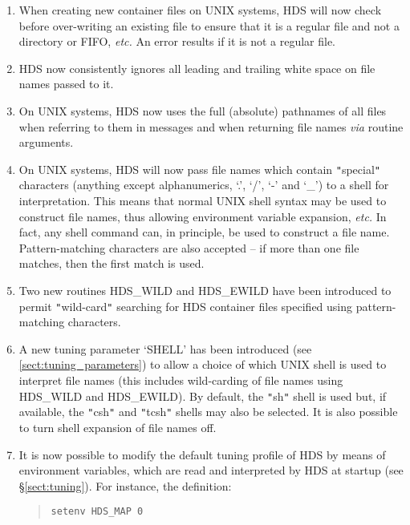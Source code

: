 \documentclass[11pt]{article}
\newcommand{\htmlref}[2]{#1}
\newcommand{\qt}[1]{``#1''}
\newcommand{\st}[1]{{\em{#1}}}
\renewcommand{\qt}[1]{{\tt{"}}#1{\tt{"}}}
\begin{document}
\begin{enumerate}
\item
When creating new container files on UNIX systems, HDS will now check
before over-writing an existing file to ensure that it is a regular
file and not a directory or FIFO, \st{etc.} An error results if it is
not a regular file.

\item
HDS now consistently ignores all leading and trailing white space on
file names passed to it.

\item
On UNIX systems, HDS now uses the full (absolute) pathnames of all
files when referring to them in messages and when returning file names
\st{via} routine arguments.

\item
On UNIX systems, HDS will now pass file names which contain
\qt{special} characters (anything except alphanumerics, `.', `/', `-'
and `\_') to a shell for interpretation. This means that normal UNIX
shell syntax may be used to construct file names, thus allowing
environment variable expansion, \st{etc.}  In fact, any shell command
can, in principle, be used to construct a file name.  Pattern-matching
characters are also accepted -- if more than one file matches, then
the first match is used.

\item
Two new routines \htmlref{HDS\_WILD}{HDS_WILD} and
\htmlref{HDS\_EWILD}{HDS_EWILD} have been introduced to permit
\qt{wild-card} searching for HDS container files specified using
pattern-matching characters.

\item
A new tuning parameter `SHELL' has been introduced (see
\ref{sect:tuning_parameters}) to allow a choice of which UNIX shell is
used to interpret file names (this includes wild-carding of file names
using \htmlref{HDS\_WILD}{HDS_WILD} and
\htmlref{HDS\_EWILD}{HDS_EWILD}). By default, the \qt{sh} shell is
used but, if available, the \qt{csh} and \qt{tcsh} shells may also be
selected. It is also possible to turn shell expansion of file names
off.

\item
It is now possible to modify the default tuning profile of HDS by
means of environment variables, which are read and interpreted by HDS
at startup (see \S\ref{sect:tuning}). For instance, the definition:

\small
\begin{quote}
\begin{verbatim}
setenv HDS_MAP 0
\end{verbatim}
\end{quote}
\normalsize


\end{enumerate}
\end{document}
